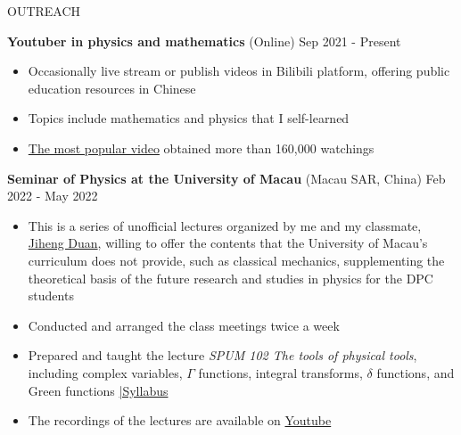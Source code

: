 \documentclass[11pt]{article}
\begin{document}
\begin{section}{OUTREACH}

\textbf{Youtuber in physics and mathematics} (Online) \hfill {Sep 2021 - Present}
\begin{itemize}[leftmargin=1.5em]
    \item Occasionally live stream or publish videos in Bilibili platform, offering public education resources in Chinese
    \item Topics include mathematics and physics that I self-learned
    \item \href{https://www.bilibili.com/video/BV1th411W7xu/}{The most popular video} obtained more than 160,000 watchings
\end{itemize}

\textbf{Seminar of Physics at the University of Macau} (Macau SAR, China) \hfill {Feb 2022 - May 2022}
\begin{itemize}[leftmargin=1.5em]
    \item This is a series of unofficial lectures organized by me and my classmate, \href{http://runawayfancy.me/}{Jiheng Duan}, willing to offer the contents that the University of Macau's curriculum does not provide, such as classical mechanics, supplementing the theoretical basis of  the future research and studies in physics for the DPC students
    \item Conducted and arranged the class meetings twice a week
    \item Prepared and taught the lecture \textit{SPUM 102 The tools of physical tools}, including complex variables, $\Gamma$ functions, integral transforms, $\delta$ functions, and Green functions \hfill {\footnotesize \href{https://github.com/Chisen-Lupus/Seminar-of-Physics-UM/blob/main/SPUM%20102%20The%20tools%20of%20physical%20tool.pdf}{|Syllabus}}
    \item The recordings of the lectures are available on \href{https://www.youtube.com/watch?v=nQkv03r-XeQ&list=PLV9fHDZW7hHWQ9rrAk7c9kdeV-Lqyt7pV&index=10}{Youtube}
\end{itemize}

\end{section}
    
\end{document}
